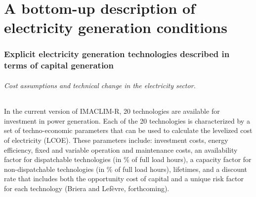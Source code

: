 \part*{A bottom-up description of electricity generation conditions}

\section{Explicit electricity generation technologies described in terms of capital generation}

\paragraph{ Cost assumptions and technical change in the electricity sector.} In the current version of IMACLIM-R, 20 technologies are available for investment in power generation. Each of the 20 technologies is characterized by a set of techno-economic parameters that can be used to calculate the levelized cost of electricity (LCOE). These parameters include: investment costs, energy efficiency, fixed and variable operation and maintenance costs, an availability factor for dispatchable technologies (in \% of full load hours), a capacity factor for non-dispatchable technologies (in \% of full load hours), lifetimes, and a discount rate that includes both the opportunity cost of capital and a unique risk factor for each technology (Briera and Lefèvre, forthcoming).

